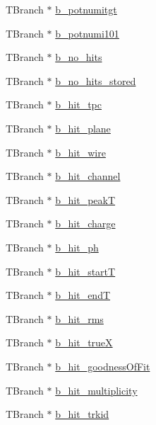 \begin{DoxyCompactItemize}
\item 
T\-Branch $\ast$ \hyperlink{classanatree_a89ab4f728c4235eeb1694c13892ecf6f}{b\-\_\-potnumitgt}
\item 
T\-Branch $\ast$ \hyperlink{classanatree_ab8e0563dc3664477ce0a3e1ea7a117ea}{b\-\_\-potnumi101}
\item 
T\-Branch $\ast$ \hyperlink{classanatree_a2601a4d29467cbdc4730f61dd308af05}{b\-\_\-no\-\_\-hits}
\item 
T\-Branch $\ast$ \hyperlink{classanatree_aceb52d7a1fb7f1cb81745cd8c53b5a4e}{b\-\_\-no\-\_\-hits\-\_\-stored}
\item 
T\-Branch $\ast$ \hyperlink{classanatree_a67859ad7bc96571ce3530c930272f51f}{b\-\_\-hit\-\_\-tpc}
\item 
T\-Branch $\ast$ \hyperlink{classanatree_a654417b656f4cbcc3d19de17ef16215f}{b\-\_\-hit\-\_\-plane}
\item 
T\-Branch $\ast$ \hyperlink{classanatree_a60739c0f4c0a4cfc08aef185cfeb6c0d}{b\-\_\-hit\-\_\-wire}
\item 
T\-Branch $\ast$ \hyperlink{classanatree_ad119c94cc8f49447df91dbeff7dd2b00}{b\-\_\-hit\-\_\-channel}
\item 
T\-Branch $\ast$ \hyperlink{classanatree_a9b50cb6896b6b5fe7cd6fdd34f203c5b}{b\-\_\-hit\-\_\-peak\-T}
\item 
T\-Branch $\ast$ \hyperlink{classanatree_a4686c69f1534f07a0696632bd4618c48}{b\-\_\-hit\-\_\-charge}
\item 
T\-Branch $\ast$ \hyperlink{classanatree_a9d5f1e4b0de0ce959688b9586c6a4c43}{b\-\_\-hit\-\_\-ph}
\item 
T\-Branch $\ast$ \hyperlink{classanatree_a0fc7c741599029b9a43342783496488e}{b\-\_\-hit\-\_\-start\-T}
\item 
T\-Branch $\ast$ \hyperlink{classanatree_af2a81e6e09faa3b768a2b6eebe8c9fd2}{b\-\_\-hit\-\_\-end\-T}
\item 
T\-Branch $\ast$ \hyperlink{classanatree_a1afdbd2be4f773ac64546aeaae0893f1}{b\-\_\-hit\-\_\-rms}
\item 
T\-Branch $\ast$ \hyperlink{classanatree_ae6895af553f60ca6df1e0b8a188a729c}{b\-\_\-hit\-\_\-true\-X}
\item 
T\-Branch $\ast$ \hyperlink{classanatree_a339f11d08fdce9583db8b8c5b8ec8752}{b\-\_\-hit\-\_\-goodness\-Of\-Fit}
\item 
T\-Branch $\ast$ \hyperlink{classanatree_a4c01a0a80c5868387a517fc0330980d1}{b\-\_\-hit\-\_\-multiplicity}
\item 
T\-Branch $\ast$ \hyperlink{classanatree_a8693443815becaeb7aa509f6fcca6b84}{b\-\_\-hit\-\_\-trkid}

\end{DoxyCompactItemize}
